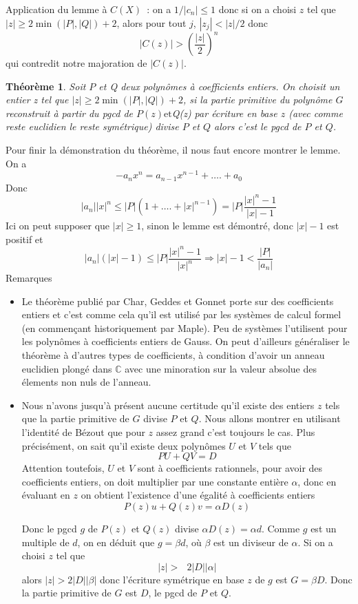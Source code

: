 \documentclass[a4paper,11pt]{article}
\newtheorem{thm}{Théorème}
\begin{document}
Application du lemme à $C(X)$~: on a $1/|c_n|\leq 1$
donc si on a choisi $z$ tel que $| z | \geqslant 2 \min ( | P |, | Q | ) + 2$,
alors pour tout $j$, $| z_j | < | z | / 2$ donc
\[ | C ( z ) | > \left( \frac{| z |}{2} \right)^n \]
qui contredit notre majoration de $| C ( z ) |$.

\begin{thm}
  Soit $P$ et Q deux polynômes à coefficients entiers. On
  choisit un entier z tel que $| z | \geqslant 2 \min ( | P |, | Q | ) + 2$,
  si la partie primitive du polynôme $G$ reconstruit à partir du pgcd de $P (
  z ) \mbox{et}$Q(z) par écriture en base $z$ (avec comme reste euclidien le
  reste symétrique) divise $P$ et $Q$ alors c'est le pgcd de $P$ et $Q$.
\end{thm}

Pour finir la démonstration du théorème, il nous faut encore montrer le lemme.
On a
\[ - a_n x^n = a_{n - 1} x^{n - 1} + \ldots . + a_0 \]
Donc
\[ | a_n | | x |^n \leqslant | P | ( 1 + \ldots . + | x |^{n - 1} ) = | P |
   \frac{| x |^n - 1}{| x | - 1} \]
Ici on peut supposer que $| x | \geqslant 1$, sinon le lemme est démontré,
donc $| x | - 1$ est positif et
\[ | a_n | ( | x | - 1 ) \leqslant | P | \frac{| x |^n - 1}{| x |^n}
   \Rightarrow | x | - 1 < \frac{| P |}{| a_n |} \]
Remarques
\begin{itemize}
  \item Le théorème publié par Char, Geddes et Gonnet 
  porte sur des coefficients entiers et
  c'est comme cela qu'il est utilisé par les systèmes de calcul formel (en
  commençant historiquement par Maple). Peu de systèmes l'utilisent pour les
  polynômes à coefficients entiers de Gauss. On peut d'ailleurs généraliser le
  théorème à d'autres types de coefficients, à condition d'avoir un anneau
  euclidien plongé dans $\mathbb{C}$ avec une minoration sur la valeur absolue
  des élements non nuls de l'anneau.
  
  \item Nous n'avons jusqu'à présent aucune certitude qu'il existe des entiers
  $z$ tels que la partie primitive de $G$ divise $P$ et $Q$. Nous allons
  montrer en utilisant l'identité de Bézout que pour $z$ assez grand c'est
  toujours le cas. Plus précisément, on sait qu'il existe deux polynômes $U$
  et $V$ tels que
  \[ P U + Q V = D \]
  Attention toutefois, $U$ et $V$ sont à coefficients rationnels, pour avoir
  des coefficients entiers, on doit multiplier par une constante entière
  $\alpha$, donc en évaluant en $z$ on obtient l'existence d'une égalité à
  coefficients entiers
  \[ P ( z ) u + Q ( z ) v = \alpha D ( z ) \]
  
  
  Donc le pgcd $g$ de $P ( z )$ et $Q ( z )$ divise $\alpha D ( z ) = \alpha
  d$. Comme $g$ est un multiple de $d$, on en déduit que $g = \beta d$, où
  $\beta$ est un diviseur de $\alpha$. Si on a choisi $z$ tel que
  \[ | z | > \text{ $2 | D | | \alpha |$} \]
  alors $| z | > 2 | D | | \beta |$ donc l'écriture symétrique en base $z$ de
  $g$ est $G = \beta D$. Donc la partie primitive de $G$ est $D$, le
  pgcd de $P$ et $Q$.
  
  
\end{itemize}
\end{document}

